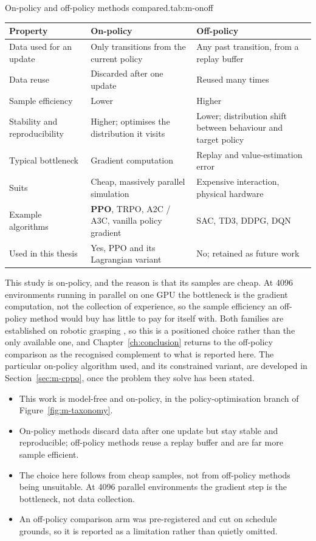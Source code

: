\begin{kuettable}[H]{On-policy and off-policy methods compared.}{tab:m-onoff}
\begin{tabular*}{\textwidth}{@{\extracolsep{\fill}}p{}p{}p{}}
\toprule
Property & On-policy & Off-policy\\
\midrule
Data used for an update & Only transitions from the current policy & Any past transition, from a replay buffer\\
Data reuse & Discarded after one update & Reused many times\\
Sample efficiency & Lower & Higher\\
Stability and reproducibility & Higher; optimises the distribution it visits & Lower; distribution shift between behaviour and target policy\\
Typical bottleneck & Gradient computation & Replay and value-estimation error\\
Suits & Cheap, massively parallel simulation & Expensive interaction, physical hardware\\
Example algorithms & \textbf{PPO}, TRPO, A2C / A3C, vanilla policy gradient & SAC, TD3, DDPG, DQN\\
Used in this thesis & Yes, PPO and its Lagrangian variant & No; retained as future work\\
\bottomrule
\end{tabular*}
\end{kuettable}

This study is on-policy, and the reason is that its samples are cheap. At 4096 environments
running in parallel on one GPU the bottleneck is the gradient computation, not the collection of
experience, so the sample efficiency an off-policy method would buy has little to pay for itself
with. Both families are established on robotic grasping \cite{shahid2022continuous_grasping}, so
this is a positioned choice rather than the only available one, and Chapter~\ref{ch:conclusion}
returns to the off-policy comparison as the recognised complement to what is reported here. The
particular on-policy algorithm used, and its constrained variant, are developed in
Section~\ref{sec:m-cppo}, once the problem they solve has been stated.

\begin{keypoints}
\begin{itemize}\tightlist
\item This work is model-free and on-policy, in the policy-optimisation branch of
Figure~\ref{fig:m-taxonomy}.
\item On-policy methods discard data after one update but stay stable and reproducible; off-policy
methods reuse a replay buffer and are far more sample efficient.
\item The choice here follows from cheap samples, not from off-policy methods being unsuitable. At
4096 parallel environments the gradient step is the bottleneck, not data collection.
\item An off-policy comparison arm was pre-registered and cut on schedule grounds, so it is reported
as a limitation rather than quietly omitted.
\end{itemize}
\end{keypoints}

